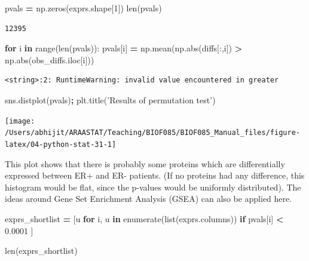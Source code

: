 \documentclass[
  letterpaper,
]{scrbook}
\newenvironment{Shaded}{\begin{snugshade}}{\end{snugshade}}
\newcommand{\BuiltInTok}[1]{#1}
\newcommand{\ControlFlowTok}[1]{\textcolor[rgb]{0.13,0.29,0.53}{\textbf{#1}}}
\newcommand{\DecValTok}[1]{\textcolor[rgb]{0.00,0.00,0.81}{#1}}
\newcommand{\FloatTok}[1]{\textcolor[rgb]{0.00,0.00,0.81}{#1}}
\newcommand{\KeywordTok}[1]{\textcolor[rgb]{0.13,0.29,0.53}{\textbf{#1}}}
\newcommand{\NormalTok}[1]{#1}
\newcommand{\OperatorTok}[1]{\textcolor[rgb]{0.81,0.36,0.00}{\textbf{#1}}}
\newcommand{\StringTok}[1]{\textcolor[rgb]{0.31,0.60,0.02}{#1}}
\begin{document}
\begin{Shaded}
\begin{Highlighting}[]
\NormalTok{pvals }\OperatorTok{=}\NormalTok{ np.zeros(exprs.shape[}\DecValTok{1}\NormalTok{])}
\BuiltInTok{len}\NormalTok{(pvals)}
\end{Highlighting}
\end{Shaded}

\begin{verbatim}
12395
\end{verbatim}

\begin{Shaded}
\begin{Highlighting}[]
\ControlFlowTok{for}\NormalTok{ i }\KeywordTok{in} \BuiltInTok{range}\NormalTok{(}\BuiltInTok{len}\NormalTok{(pvals)):}
\NormalTok{    pvals[i] }\OperatorTok{=}\NormalTok{ np.mean(np.}\BuiltInTok{abs}\NormalTok{(diffs[:,i]) }\OperatorTok{>}\NormalTok{ np.}\BuiltInTok{abs}\NormalTok{(obs_diffs.iloc[i]))}
\end{Highlighting}
\end{Shaded}

\begin{verbatim}
<string>:2: RuntimeWarning: invalid value encountered in greater
\end{verbatim}

\begin{Shaded}
\begin{Highlighting}[]
\NormalTok{sns.distplot(pvals)}\OperatorTok{;}
\NormalTok{plt.title(}\StringTok{'Results of permutation test'}\NormalTok{)}
\end{Highlighting}
\end{Shaded}

\begin{center}\texttt{[image: /Users/abhijit/ARAASTAT/Teaching/BIOF085/BIOF085\_Manual\_files/figure-latex/04-python-stat-31-1]} \end{center}

This plot shows that there is probably some proteins which are differentially expressed between ER+ and ER- patients. (If no proteins had any difference, this histogram would be flat, since the p-values would be uniformly distributed). The ideas around Gene Set Enrichment Analysis (GSEA) can also be applied here.

\begin{Shaded}
\begin{Highlighting}[]
\NormalTok{exprs_shortlist }\OperatorTok{=}\NormalTok{ [u }\ControlFlowTok{for}\NormalTok{ i, u }\KeywordTok{in} \BuiltInTok{enumerate}\NormalTok{(}\BuiltInTok{list}\NormalTok{(exprs.columns)) }
                   \ControlFlowTok{if}\NormalTok{ pvals[i] }\OperatorTok{<} \FloatTok{0.0001}\NormalTok{ ]}

\BuiltInTok{len}\NormalTok{(exprs_shortlist)}
\end{Highlighting}
\end{Shaded}
\end{document}
